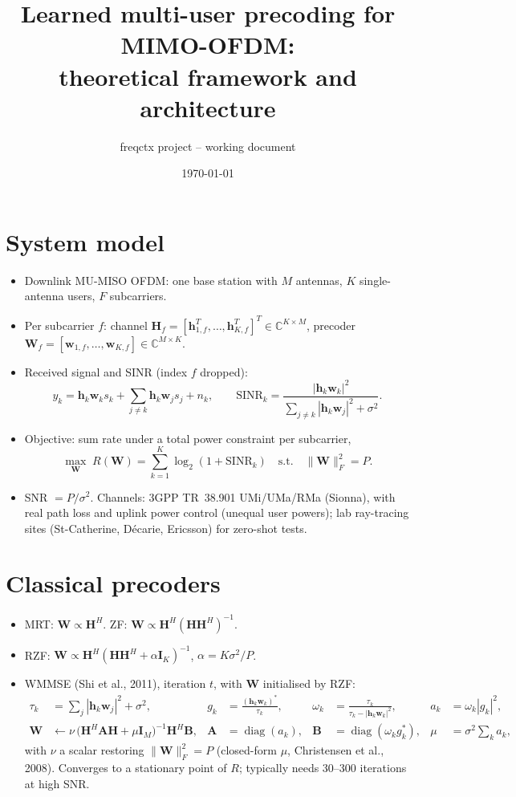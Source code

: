 \documentclass[10pt,a4paper]{article}
\title{Learned multi-user precoding for MIMO-OFDM:\\ theoretical framework and architecture}
\author{freqctx project -- working document}
\date{\today}
\newcommand{\Hm}{\mathbf{H}}
\newcommand{\Wm}{\mathbf{W}}
\newcommand{\I}{\mathbf{I}}
\newcommand{\h}{\mathbf{h}}
\newcommand{\w}{\mathbf{w}}
\newcommand{\diag}{\operatorname{diag}}
\begin{document}
\maketitle

\section{System model}
\begin{itemize}
  \item Downlink MU-MISO OFDM: one base station with $M$ antennas, $K$ single-antenna users, $F$ subcarriers.
  \item Per subcarrier $f$: channel $\Hm_f = [\h_{1,f}^T,\dots,\h_{K,f}^T]^T \in \mathbb{C}^{K\times M}$, precoder $\Wm_f = [\w_{1,f},\dots,\w_{K,f}] \in \mathbb{C}^{M\times K}$.
  \item Received signal and SINR (index $f$ dropped):
  \begin{equation}
    y_k = \h_k \w_k s_k + \sum_{j\neq k} \h_k \w_j s_j + n_k, \qquad
    \mathrm{SINR}_k = \frac{|\h_k\w_k|^2}{\sum_{j\neq k}|\h_k\w_j|^2 + \sigma^2}.
  \end{equation}
  \item Objective: sum rate under a total power constraint per subcarrier,
  \begin{equation}
    \max_{\Wm}\; R(\Wm) = \sum_{k=1}^K \log_2(1+\mathrm{SINR}_k) \quad \text{s.t.}\quad \|\Wm\|_F^2 = P .
  \end{equation}
  \item SNR $= P/\sigma^2$. Channels: 3GPP TR~38.901 UMi/UMa/RMa (Sionna), with real path loss and uplink power control
        (unequal user powers); lab ray-tracing sites (St-Catherine, D\'ecarie, Ericsson) for zero-shot tests.
\end{itemize}

\section{Classical precoders}
\begin{itemize}
  \item MRT: $\Wm \propto \Hm^H$. \quad ZF: $\Wm \propto \Hm^H(\Hm\Hm^H)^{-1}$.
  \item RZF: $\Wm \propto \Hm^H(\Hm\Hm^H + \alpha\I_K)^{-1}$, $\alpha = K\sigma^2/P$.
  \item WMMSE (Shi et al., 2011), iteration $t$, with $\Wm$ initialised by RZF:
  \begin{align}
    \tau_k &= \textstyle\sum_j |\h_k\w_j|^2 + \sigma^2, &
    g_k &= \frac{(\h_k\w_k)^*}{\tau_k}, &
    \omega_k &= \frac{\tau_k}{\tau_k - |\h_k\w_k|^2}, &
    a_k &= \omega_k |g_k|^2, \\
    \Wm &\leftarrow \nu\,\big(\Hm^H \mathbf{A}\Hm + \mu\I_M\big)^{-1}\Hm^H \mathbf{B}, &
    \mathbf{A} &= \diag(a_k), &
    \mathbf{B} &= \diag(\omega_k g_k^*), &
    \mu &= \sigma^2 \textstyle\sum_k a_k,
  \end{align}
  with $\nu$ a scalar restoring $\|\Wm\|_F^2 = P$ (closed-form $\mu$, Christensen et al., 2008).
  Converges to a stationary point of $R$; typically needs 30--300 iterations at high SNR.
\end{itemize}
\end{document}
